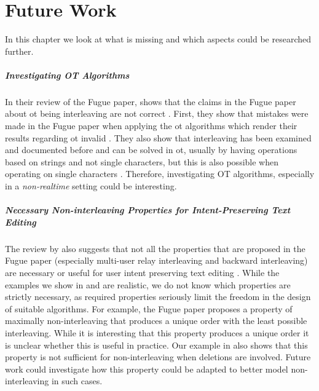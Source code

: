 \chapter{Future Work} \label{chapter:future-work}

In this chapter we look at what is missing and which aspects could be researched further.

\paragraph{Investigating OT Algorithms}

In their review of the Fugue paper,  shows that the claims in the Fugue paper \cite{2023-weidner-minimizing-interleaving} about \gls{ot} being interleaving are not correct \cite{2023-sun-critical-examination-fugue-ot,
  2023-sun-critical-examination-fugue-ot-1,2023-sun-critical-examination-fugue-ot-2,2023-sun-critical-examination-fugue-ot-3}.
First, they show that mistakes were made in the Fugue paper when applying the \gls{ot} algorithms which render their results regarding \gls{ot} invalid \cite{2023-sun-critical-examination-fugue-ot-1,2023-sun-critical-examination-fugue-ot-2}.
They also show that interleaving has been examined and documented before and can be solved in \gls{ot}, usually by having operations based on strings and not single characters, but this is also possible when operating on single characters \cite{2023-sun-critical-examination-fugue-ot-2}. Therefore, investigating OT algorithms, especially in a \textit{non-realtime} setting could be interesting.

\paragraph{Necessary Non-interleaving Properties for Intent-Preserving Text Editing}

The review by  also suggests that not all the properties that are proposed in the Fugue paper (especially multi-user relay interleaving and backward interleaving) are necessary or useful for user intent preserving text editing \cite{2023-sun-critical-examination-fugue-ot-2}. While the examples we show in  and  are realistic, we do not know which properties are strictly necessary, as required properties seriously limit the freedom in the design of suitable algorithms. For example, the Fugue paper proposes a property of maximally non-interleaving that produces a unique order with the least possible interleaving. While it is interesting that this property produces a unique order it is unclear whether this is useful in practice. Our example in  also shows that this property is not sufficient for non-interleaving when deletions are involved. Future work could investigate how this property could be adapted to better model non-interleaving in such cases.

